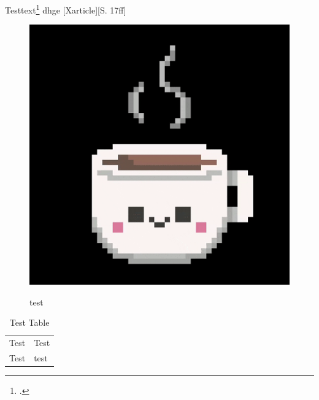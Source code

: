 Testtext\footcite{Xarticle} 
\ac{dhge}
[Xarticle][S. 17ff]
\doubleunderline{$150\mathrm{\Omega}$}

\renewFigTabCap

\begin{figure}[]
	\centering
	\caption{test}
	\includegraphics{img}
	\label{fig:anlagentest}
\end{figure}

\begin{table}
	\caption{Test Table}
	\begin{tabular}{ll}
		Test & Test\\
		Test & test
	\end{tabular}
\end{table}